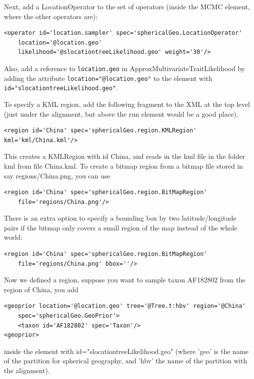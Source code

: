\documentclass{article}
\begin{document}
Next, add a LocationOperator to the set of operators (inside the MCMC element, where the other operators are):

\begin{verbatim}
<operator id='location.sampler' spec='sphericalGeo.LocationOperator' 
    location='@location.geo' 
    likelihood='@slocationtreeLikelihood.geo' weight='30'/>
\end{verbatim}

Also, add a reference to {\tt location.geo} in ApproxMultivariateTraitLikelihood by adding the attribute {\tt location="@location.geo"} to the element with {\tt id="slocationtreeLikelihood.geo"}.

To specify a KML region, add the following fragment to the XML at the top level (just under the alignment, but above the run element would be a good place).

\begin{verbatim}
<region id='China' spec='sphericalGeo.region.KMLRegion' kml='kml/China.kml'/>
\end{verbatim}

This creates a KMLRegion with id China, and reads in the kml file in the folder kml from file China.kml. To create a bitmap region from a bitmap file stored in say regions/China.png, you can use

\begin{verbatim}
<region id='China' spec='sphericalGeo.region.BitMapRegion'
	file='regions/China.png'/>
\end{verbatim}
There is an extra option to specify a bounding box by two latitude/longitude pairs if the bitmap only covers a small region of the map instead of the whole world:
\begin{verbatim}
<region id='China' spec='sphericalGeo.region.BitMapRegion'
	file='regions/China.png' bbox=''/>
\end{verbatim}



Now we defined a region, suppose you want to sample taxon AF182802 from the region of China, you add

\begin{verbatim}
<geoprior location='@location.geo' tree='@Tree.t:hbv' region='@China'
	spec='sphericalGeo.GeoPrior'>
	<taxon id='AF182802' spec='Taxon'/> 
<geoprior>
\end{verbatim}

inside the element with id="slocationtreeLikelihood.geo" (where 'geo' is the name of the partition for spherical geography, and 'hbv' the name of the partition with the alignment).
\end{document}
